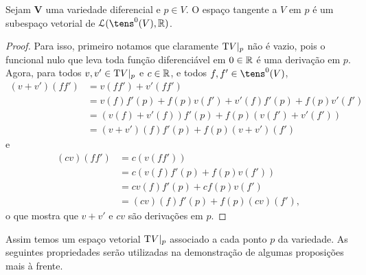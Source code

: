 \begin{prop}
Sejam $\bm V$ uma variedade diferencial e $p \in V$. O espaço tangente a $V$ em $p$ é um subespaço vetorial de $\lin(\tens^0(V),\R)$.
\end{prop}
\begin{proof}
Para isso, primeiro notamos que claramente $\mathrm{T} V|_p$ não é vazio, pois o funcional nulo que leva toda função diferenciável em $0 \in \mathbb{R}$ é uma derivação em $p$.
%
Agora, para todos $v,v' \in \mathrm{T} V|_p$ e $c \in \mathbb{R}$, e todos $f,f' \in \tens^0(V)$,
	\begin{align*}
	(v+v')(ff') &= v(ff') + v'(ff') \\
		&= v(f)f'(p) + f(p)v(f') + v'(f)f'(p) + f(p)v'(f') \\
		&= (v(f) + v'(f))f'(p) + f(p)(v(f') + v'(f')) \\
		&= (v+v')(f)f'(p) + f(p)(v+v')(f')
	\end{align*}
e
	\begin{align*}
	(cv)(ff') &= c(v(ff')) \\
		&= c(v(f)f'(p) + f(p)v(f')) \\
		&= cv(f)f'(p) + cf(p)v(f') \\
		&= (cv)(f)f'(p) + f(p)(cv)(f'),
	\end{align*}
o que mostra que $v+v'$ e $cv$ são derivações em $p$.
\end{proof}

Assim temos um espaço vetorial $\mathrm{T} V|_p$ associado a cada ponto $p$ da variedade. As seguintes propriedades serão utilizadas na demonstração de algumas proposições mais à frente.

